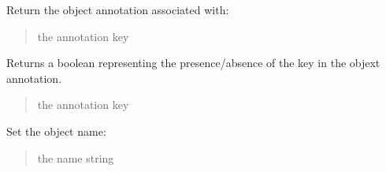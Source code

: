 \documentclass[letterpaper,12pt,english]{sphinxmanual}
\begin{document}
\begin{fulllineitems}
\begin{fulllineitems}
\end{fulllineitems}


\begin{fulllineitems}
\label{\detokenize{api/core:cbmpy.CBModel.Fbase.getAnnotation}}
\pysigstartsignatures
\pysiglinewithargsret
{}
{}
{}
\pysigstopsignatures
\sphinxAtStartPar
Return the object annotation associated with:
\begin{quote}\begin{description}
\sphinxAtStartPar
{} \textendash{} the annotation key

\end{description}\end{quote}

\end{fulllineitems}


\begin{fulllineitems}
\label{\detokenize{api/core:cbmpy.CBModel.Fbase.hasAnnotation}}
\pysigstartsignatures
\pysiglinewithargsret
{}
{}
{}
\pysigstopsignatures
\sphinxAtStartPar
Returns a boolean representing the presence/absence of the key in the objext annotation.
\begin{quote}\begin{description}
\sphinxAtStartPar
{} \textendash{} the annotation key

\end{description}\end{quote}

\end{fulllineitems}


\begin{fulllineitems}
\label{\detokenize{api/core:cbmpy.CBModel.Fbase.setName}}
\pysigstartsignatures
\pysiglinewithargsret
{}
{}
{}
\pysigstopsignatures
\sphinxAtStartPar
Set the object name:
\begin{quote}\begin{description}
\sphinxAtStartPar
{} \textendash{} the name string


\end{description}
\end{quote}
\end{fulllineitems}
\end{fulllineitems}
\end{document}
